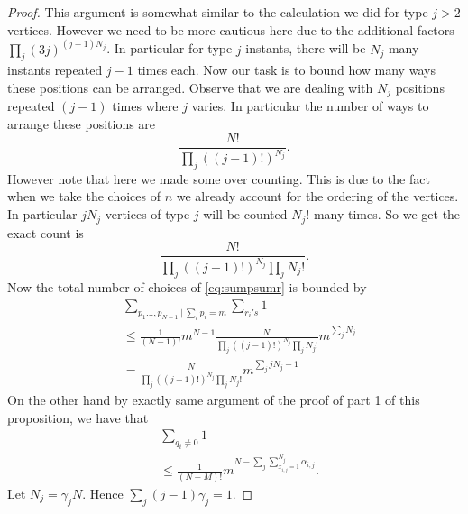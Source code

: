 \documentclass[12pt]{article}
\numberwithin{equation}{section}
\numberwithin{equation}{section}
\theoremstyle{definition}
\renewcommand{\1}{\bf 1}
\begin{document}
\begin{proof}
This argument is somewhat similar to the calculation we did for type $j>2$ vertices. However we need to be more cautious here due to the additional factors $\prod_{j}(3j)^{(j-1)N_{j}}$. In particular for type $j$ instants, there will be $N_{j}$ many instants repeated $j-1$ times each. Now our task is to bound how many ways these positions can be arranged. Observe that we are dealing with $N_{j}$ positions repeated $(j-1)$ times where $j$ varies. In particular the number of ways to arrange these positions are 
\begin{equation}
\frac{N!}{\prod_{j} ((j-1)!)^{N_{j}} }.
\end{equation}  
However note that here we made some over counting. This is due to the fact when we take the choices of $n$ we already account for the ordering of the vertices. In particular $jN_{j}$ vertices of type $j$ will be counted $N_{j}!$ many times. So we get the exact count is 
\begin{equation}
\frac{N!}{\prod_{j} ((j-1)!)^{N_{j}} \prod_{j} N_{j}!}.
\end{equation}  
Now the total number of choices of \eqref{eq:sumpsumr} is bounded by 
\begin{equation}\label{eq:sumpsumrsim}
\begin{split}
&\sum_{p_{1}\ldots,p_{N-1}~|~ \sum_{i}p_{i}=m} \sum_{r_{i}'s}1\\
&\le \frac{1}{(N-1)!} m^{N-1} \frac{N!}{\prod_{j} ((j-1)!)^{N_{j}} \prod_{j} N_{j}!}m^{\sum_{j}N_{j}}\\
& =  \frac{N}{\prod_{j} ((j-1)!)^{N_{j}} \prod_{j} N_{j}!} m^{\sum_{j} jN_{j}-1}
\end{split}
\end{equation} 
On the other hand by exactly same argument of the proof of part 1 of this proposition, we have that 
\begin{equation}\label{eq:sumq}
\begin{split}
&\sum_{q_{i}\neq 0} 1\\
&\le \frac{1}{\left(N- M\right)!} m^{N- \sum_{j}\sum_{x_{i,j}=1}^{N_{j}}\alpha_{i,j}}.
\end{split}
\end{equation} 
Let $N_{j}=\gamma_{j}N$. Hence $\sum_{j}(j-1)\gamma_{j}=1.$


\end{proof}
\end{document}
